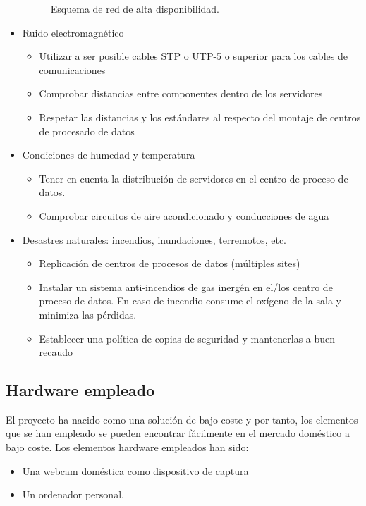 \begin{itemize}
	\begin{figure}[h!]
        	\centering
		
        	\caption{Esquema de red de alta disponibilidad.}
		\label{fig:network_diagram}
	\end{figure}

	\item{Ruido electromagnético}
		\begin{itemize}
			\item{Utilizar a ser posible cables STP o UTP-5 o superior para los cables de comunicaciones}
			\item{Comprobar distancias entre componentes dentro de los servidores}
			\item{Respetar las distancias y los estándares al respecto del montaje de centros de procesado de datos}
		\end{itemize}

	\item{Condiciones de humedad y temperatura}
		\begin{itemize}
			\item{Tener en cuenta la distribución de servidores en el centro de proceso de datos.}
			\item{Comprobar circuitos de aire acondicionado y conducciones de agua}
		\end{itemize}

	\item{Desastres naturales: incendios, inundaciones, terremotos, etc. }
		\begin{itemize}
			\item{Replicación de centros de procesos de datos (múltiples sites)}
			\item{Instalar un sistema anti-incendios de gas inergén en el/los centro de proceso de datos. En caso de incendio consume el oxígeno de la sala y minimiza las pérdidas.}
			\item{Establecer una política de copias de seguridad y mantenerlas a buen recaudo}
		\end{itemize}
\end{itemize}


\subsection{Hardware empleado}
El proyecto ha nacido como una solución de bajo coste y por tanto, los elementos que se han empleado se pueden encontrar fácilmente en el mercado doméstico a bajo coste. Los elementos hardware empleados han sido:
\begin{itemize}
	\item{Una webcam doméstica como dispositivo de captura}
	\item{Un ordenador personal.}
\end{itemize}

